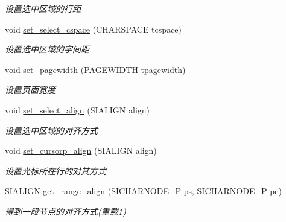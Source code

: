 \begin{DoxyCompactItemize}
\begin{DoxyCompactList}\small\item\em 设置选中区域的行距 \end{DoxyCompactList}\item 
\mbox{\label{class_s_i_t_e_x_t_a4fde9667222b3289a6c98da2871661af}} 
void \hyperlink{class_s_i_t_e_x_t_a4fde9667222b3289a6c98da2871661af}{set\+\_\+select\+\_\+cspace} (C\+H\+A\+R\+S\+P\+A\+CE tcspace)
\begin{DoxyCompactList}\small\item\em 设置选中区域的字间距 \end{DoxyCompactList}\item 
\mbox{\label{class_s_i_t_e_x_t_a324e28153c8ebfeb4cabc3b82171c5e5}} 
void \hyperlink{class_s_i_t_e_x_t_a324e28153c8ebfeb4cabc3b82171c5e5}{set\+\_\+pagewidth} (P\+A\+G\+E\+W\+I\+D\+TH tpagewidth)
\begin{DoxyCompactList}\small\item\em 设置页面宽度 \end{DoxyCompactList}\item 
\mbox{\label{class_s_i_t_e_x_t_ad37947fae9aa012847b5b32c73d32af7}} 
void \hyperlink{class_s_i_t_e_x_t_ad37947fae9aa012847b5b32c73d32af7}{set\+\_\+select\+\_\+align} (S\+I\+A\+L\+I\+GN align)
\begin{DoxyCompactList}\small\item\em 设置选中区域的对齐方式 \end{DoxyCompactList}\item 
\mbox{\label{class_s_i_t_e_x_t_a1717bc1a3f8d797fc52654ffb7aafb87}} 
void \hyperlink{class_s_i_t_e_x_t_a1717bc1a3f8d797fc52654ffb7aafb87}{set\+\_\+cursorp\+\_\+align} (S\+I\+A\+L\+I\+GN align)
\begin{DoxyCompactList}\small\item\em 设置光标所在行的对其方式 \end{DoxyCompactList}\item 
S\+I\+A\+L\+I\+GN \hyperlink{class_s_i_t_e_x_t_a43b43ba8dc025b49555f527734508465}{get\+\_\+range\+\_\+align} (\hyperlink{class_s_i_c_h_a_r_n_o_d_e}{S\+I\+C\+H\+A\+R\+N\+O\+D\+E\+\_\+P} ps, \hyperlink{class_s_i_c_h_a_r_n_o_d_e}{S\+I\+C\+H\+A\+R\+N\+O\+D\+E\+\_\+P} pe)
\begin{DoxyCompactList}\small\item\em 得到一段节点的对齐方式(重载1)~\newline

\end{DoxyCompactList}
\end{DoxyCompactItemize}
